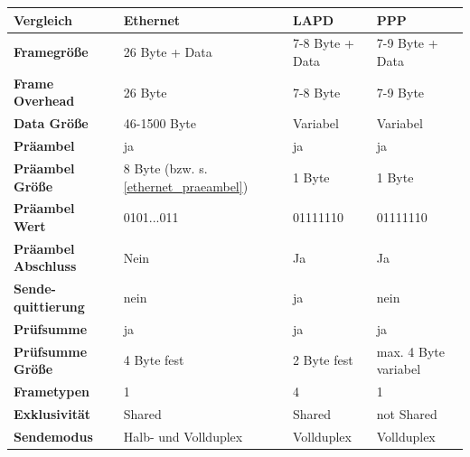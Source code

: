 \documentclass[12pt, a4paper, ngerman]{article}
\begin{document}
\begin{tabular}{| m{\dimexpr.2\linewidth} || m{\dimexpr.2\linewidth} | m{\dimexpr.2\linewidth} | m{\dimexpr.2\linewidth} |}
\hline
\textbf{Vergleich} & \textbf{Ethernet} & \textbf{LAPD} & \textbf{PPP} \\ \hline \hline

\textbf{Framegröße} & 26 Byte + Data & 7-8 Byte + Data & 7-9 Byte + Data \\ \hline

\textbf{Frame \newline Overhead} & 26 Byte  & 7-8 Byte  & 7-9 Byte  \\ \hline

\textbf{Data Größe} & 46-1500 Byte & Variabel & Variabel \\ \hline

\textbf{Präambel} & ja & ja & ja\\ \hline

\textbf{Präambel Größe} & 8 Byte (bzw. s. \ref{ethernet_praeambel})  & 1 Byte & 1 Byte\\ \hline

\textbf{Präambel Wert} & 0101...011  & 01111110 & 01111110\\ \hline

\textbf{Präambel \newline Abschluss} & Nein & Ja & Ja\\ \hline

\textbf{Sende-quittierung} & nein & ja & nein\\ \hline
\textbf{Prüfsumme} & ja & ja & ja\\ \hline

\textbf{Prüfsumme Größe} & 4 Byte \newline fest & 2 Byte \newline fest & max. 4 Byte \newline variabel \\ \hline

\textbf{Frametypen} & 1 & 4 &  1\\ \hline

\textbf{Exklusivität} & Shared & Shared & not Shared\\ \hline

\textbf{Sendemodus} & Halb- und Vollduplex & Vollduplex & Vollduplex \\ \hline
\end{tabular}


   
\nocite{*} 

\newpage
\sloppy
\printbibliography 



\newpage
\listoffigures
\end{document}
